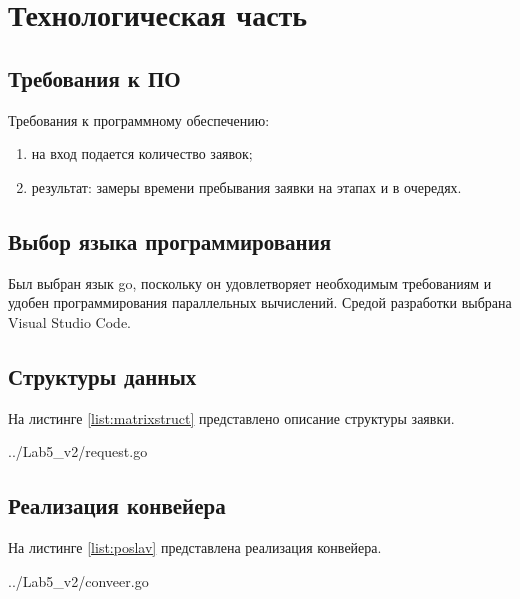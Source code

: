 
\chapter{Технологическая часть}\label{tecnology}

\section{Требования к ПО}\label{Requirements}

Требования к программному обеспечению:
\begin{enumerate}
    \item на вход подается количество заявок;
    \item результат: замеры времени пребывания заявки на этапах и в очередях. 
\end{enumerate}

\section{Выбор языка программирования}\label{Language}

Был выбран язык go, поскольку он удовлетворяет необходимым требованиям и удобен программирования параллельных вычислений. 
Средой разработки выбрана Visual Studio Code.

\section{Структуры данных}\label{StructsList}

На листинге \ref{list:matrixstruct} представлено описание структуры заявки.

\begin{lstinputlisting}
    [caption = {Структура матрицы},
    label = {list:matrixstruct},
    linerange={30-39},
    ]{../Lab5_v2/request.go}
\end{lstinputlisting}

\section{Реализация конвейера}\label{Listings}

На листинге \ref{list:poslav} представлена реализация конвейера.

\begin{lstinputlisting}
    [caption = {Реализация последовательного алгоритма нахождения среднего арифметического матрицы},
    label = {list:poslav},
    linerange={15-84},
    ]{../Lab5_v2/conveer.go}
\end{lstinputlisting}

